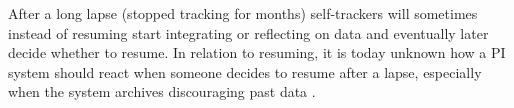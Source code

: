 After a long lapse (stopped tracking for months) self-trackers will sometimes instead of resuming start integrating or reflecting on data and eventually later decide whether to resume. In relation to resuming, it is today unknown how a PI system should react when someone decides to resume after a lapse, especially when the system archives discouraging past data \citep{Epstein2015}.